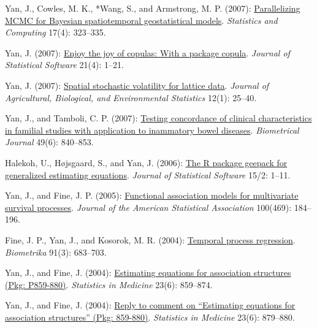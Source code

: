 \begin{RefereedJournalArticles}
\item Yan, J., Cowles, M. K., *Wang, S., and Armstrong, M. P.
(2007): \href{https://doi.org/10.1007/s11222-007-9022-2}{Parallelizing
MCMC for Bayesian spatiotemporal geostatistical models}.
\emph{Statistics and Computing} 17(4): 323--335.

\item Yan, J. (2007): \href{https://doi.org/10.18637/jss.v021.i04}{Enjoy the
joy of copulas: With a package copula}. \emph{Journal of Statistical
Software} 21(4): 1--21.

\item Yan, J. (2007): \href{https://doi.org/10.1198/108571107x178068}{Spatial
stochastic volatility for lattice data}. \emph{Journal of Agricultural,
Biological, and Environmental Statistics} 12(1): 25--40.

\item Yan, J., and Tamboli, C. P. (2007):
\href{https://doi.org/10.1002/bimj.200710383}{Testing concordance of
clinical characteristics in familial studies with application to
inammatory bowel diseases}. \emph{Biometrical Journal} 49(6): 840--853.

\item Halekoh, U., H\o jsgaard, S., and Yan, J. (2006):
\href{https://doi.org/10.18637/jss.v015.i02}{The R package geepack for
generalized estimating equations}. \emph{Journal of Statistical
Software} 15/2: 1--11.

\item Yan, J., and Fine, J. P. (2005):
\href{https://doi.org/10.1198/016214504000001286}{Functional association
models for multivariate survival processes}. \emph{Journal of the
American Statistical Association} 100(469): 184--196.

\item Fine, J. P., Yan, J., and Kosorok, M. R. (2004):
\href{https://doi.org/10.1093/biomet/91.3.683}{Temporal process
regression}. \emph{Biometrika} 91(3): 683--703.

\item Yan, J., and Fine, J. (2004):
\href{https://doi.org/10.1002/sim.1650}{Estimating equations for
association structures (Pkg: P859-880)}. \emph{Statistics in Medicine}
23(6): 859--874.

\item Yan, J., and Fine, J. (2004):
\href{https://doi.org/10.1002/sim.1736}{Reply to comment on
{``Estimating equations for association structures''} (Pkg: 859-880)}.
\emph{Statistics in Medicine} 23(6): 879--880.

\end{RefereedJournalArticles}

